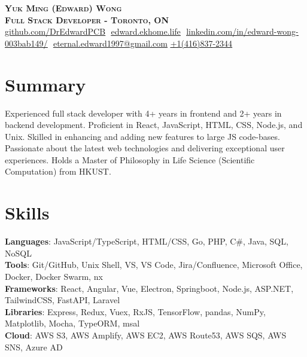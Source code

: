 \documentclass[letterpaper,11pt]{article}
\begin{document}

\vspace*{-7pt}

\begin{center}
    \textbf{\Huge \scshape Yuk Ming (Edward) Wong} \\ \vspace{8pt}
      \textbf{\small \scshape Full Stack Developer - Toronto, ON} \\ \vspace{8pt}
    \small 
    \href{https://github.com/DrEdwardPCB}{\underline{github.com/DrEdwardPCB}} $  $
    \href{https://edward.ekhome.life}
    {\underline{edward.ekhome.life}} $  $
    \href{https://www.linkedin.com/in/edward-wong-003bab149/}{\underline{linkedin.com/in/edward-wong-003bab149/}} $  $
    \href{mailto:eternal.edward1997@gmail.com}
    {\underline{eternal.edward1997@gmail.com}}$  $
    \href{tel:+14168372344}
    {\underline{+1(416)837-2344}}
\end{center}
\section{Summary}
  {\small{Experienced full stack developer with 4+ years in frontend and 2+ years in backend development. Proficient in React, JavaScript, HTML, CSS, Node.js, and Unix. Skilled in enhancing and adding new features to large JS code-bases. Passionate about the latest web technologies and delivering exceptional user experiences. Holds a Master of Philosophy in Life Science (Scientific Computation) from HKUST.}}
  
\section{Skills}
 \begin{itemize}[leftmargin=0.15in, label={}]
    \small{\item{
    
     \textbf{Languages}{: JavaScript/TypeScript, HTML/CSS, Go, PHP, C\#, Java, SQL, NoSQL} \\
     
     \textbf{Tools}{: Git/GitHub, Unix Shell, VS, VS Code, Jira/Confluence, Microsoft Office, Docker, Docker Swarm, nx }\\
     
    \textbf{Frameworks}{: React, Angular, Vue, Electron, Springboot, Node.js, ASP.NET, TailwindCSS, FastAPI, Laravel}\\
    \textbf{Libraries}{: Express, Redux, Vuex, RxJS, TensorFlow, pandas, NumPy, Matplotlib, Mocha, TypeORM, msal}\\
    \textbf{Cloud}{: AWS S3, AWS Amplify, AWS EC2, AWS Route53, AWS SQS, AWS SNS, Azure AD}
     
    }}
 \end{itemize}
 
\end{document}
